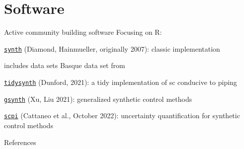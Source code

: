 \documentclass[notes,11pt, aspectratio=169]{beamer}
\newenvironment{wideitemize}{\itemize\addtolength{\itemsep}{10pt}}{\enditemize}
\begin{document}
\section{Software}

\begin{frame}{Active community building software}
    Focusing on R: 
    \medskip

    \begin{wideitemize}
        \item \textcolor{blue}{\texttt{\href{https://cran.r-project.org/web/packages/Synth/index.html}{synth}}} (Diamond, Hainmueller, originally 2007): classic implementation
            \begin{wideitemize} 
            \item includes data sets Basque data set from \cite{abadie_economic_2003} 
            \end{wideitemize}
        \item \textcolor{blue}{\texttt{\href{https://cran.r-project.org/web/packages/tidysynth/index.html}{tidysynth}}} (Dunford, 2021): a tidy implementation of sc conducive to piping 
        \item \textcolor{blue}{\texttt{\href{https://yiqingxu.org/packages/gsynth/}{gsynth}}} (Xu, Liu 2021): generalized synthetic control methods
        \item \textcolor{blue}{\texttt{\href{https://nppackages.github.io/scpi/}{scpi}}} (Cattaneo et al., October 2022): uncertainty quantification for synthetic control methods
    \end{wideitemize}
\end{frame}
   
\begin{frame}[allowframebreaks]{References}
\printbibliography
\end{frame}
\end{document}
